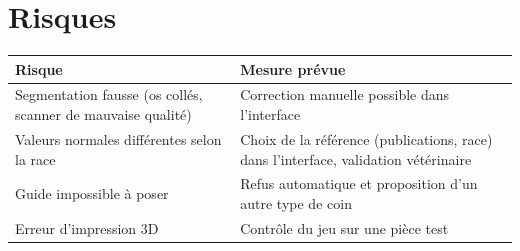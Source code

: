 \documentclass[11pt,a4paper]{article}
\begin{document}
\section{Risques}

\begin{tabularx}{\textwidth}{@{}XX@{}}
\toprule
\textbf{Risque} & \textbf{Mesure prévue} \\ \midrule
Segmentation fausse (os collés, scanner de mauvaise qualité) & Correction manuelle possible dans l'interface \\
Valeurs normales différentes selon la race & Choix de la référence (publications, race) dans l'interface, validation vétérinaire \\
Guide impossible à poser & Refus automatique et proposition d'un autre type de coin \\
Erreur d'impression 3D & Contrôle du jeu sur une pièce test \\ \bottomrule
\end{tabularx}
\end{document}
